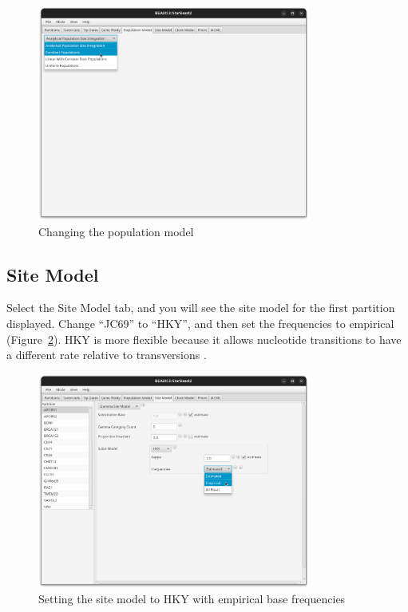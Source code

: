 \documentclass[12pt]{article}
\begin{document}
\begin{figure}[htb!]
\centering
\includegraphics[width=0.8\textwidth]{figures/constantPopulations.png}
\caption
{Changing the population model}
\label{fig:constantPopulations}
\end{figure}

\subsection{Site Model}
\label{subsec:siteModel}

Select the Site Model tab, and you will see the site model for the first partition
displayed. Change ``JC69'' to ``HKY'', and then set the frequencies to
empirical (Figure~\ref{fig:hky}).
HKY is more flexible because it allows nucleotide transitions to have a different
rate relative to transversions \parencite{Hasegawa1985}.

\begin{figure}[htb!]
\centering
\includegraphics[width=0.8\textwidth]{figures/hky.png}
\caption
{Setting the site model to HKY with empirical base frequencies}
\label{fig:hky}
\end{figure}
\end{document}

